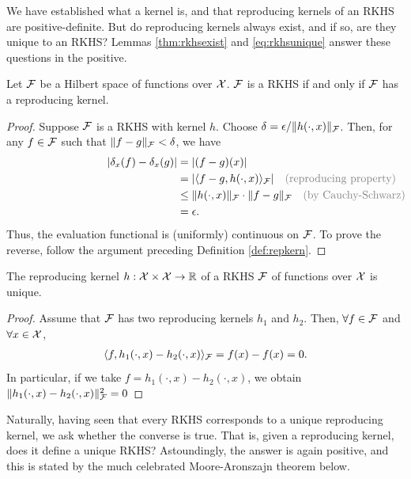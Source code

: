 We have established what a kernel is, and that reproducing kernels of an RKHS are positive-definite. 
But do reproducing kernels always exist, and if so, are they unique to an RKHS?
Lemmas \ref{thm:rkhsexist} and \ref{eq:rkhsunique} answer these questions in the positive.

\begin{lemma}\label{thm:rkhsexist}
  Let ${\mathcal F}$ be a Hilbert space of functions over ${\mathcal X}$.
  ${\mathcal F}$ is a RKHS if and only if ${\mathcal F}$ has a reproducing kernel.  
\end{lemma}

\begin{proof}
  Suppose ${\mathcal F}$ is a RKHS with kernel $h$.
  Choose $\delta=\epsilon / \lVert h(\cdot,x)\rVert_{\mathcal F}$.
  Then, for any $f \in {\mathcal F}$ such that $\lVert f-g\rVert_{\mathcal F} < \delta$, we have
  \begin{align*}
    \vert \delta_x (f) - \delta_x (g) \vert 
    &= \vert (f-g)(x) \vert \\
    &= |\ip{f-g,h(\cdot,x)}_\cF| \hspace{1em} \rlap{\color{gray} (reproducing property)} \\
    &\leq \norm{h(\cdot,x)}_\cF \cdot \norm{f-g}_\cF \hspace{1em} \rlap{\color{gray} (by Cauchy-Schwarz)} \\
    &= \epsilon.
  \end{align*}
  Thus, the evaluation functional is (uniformly) continuous on ${\mathcal F}$.
  To prove the reverse, follow the argument preceding Definition \ref{def:repkern}.
\end{proof}

\begin{lemma}\label{eq:rkhsunique}
  The reproducing kernel $h:{\mathcal X}\times{\mathcal X}\to\mathbb{R}$ of a RKHS ${\mathcal F}$ of functions over ${\mathcal X}$ is unique.
\end{lemma}

\begin{proof}
  Assume that ${\mathcal F}$ has two reproducing kernels $h_1$ and $h_2$. 
  Then, $\forall f\in{\mathcal F}$ and $\forall x\in{\mathcal X}$,
  \begin{align*}
    \langle f,h_1(\cdot,x) - h_2(\cdot,x)\rangle_{\mathcal F} = f(x) - f(x) = 0.
  \end{align*}
  In particular, if we take $f = h_1(\cdot,x) - h_2(\cdot,x)$, we obtain $\lVert h_1(\cdot,x) - h_2(\cdot,x)\rVert^2_{\mathcal F} = 0$
\end{proof}

Naturally, having seen that every RKHS corresponds to a unique reproducing kernel, we ask whether the converse is true.
That is, given a reproducing kernel, does it define a unique RKHS?
Astoundingly, the answer is again positive, and this is stated by the much celebrated Moore-Aronszajn theorem below.

